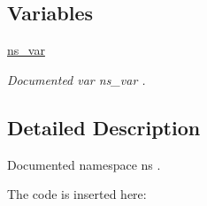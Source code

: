 \subsection*{Variables}
\begin{DoxyCompactItemize}
\item 
\mbox{\hyperlink{namespacens_a23fe65677d9880119abcb457a677453e}{ns\+\_\+var}}
\begin{DoxyCompactList}\small\item\em Documented var {\ttfamily ns\+\_\+var} . \end{DoxyCompactList}\end{DoxyCompactItemize}


\subsection{Detailed Description}
Documented namespace {\ttfamily ns} . 

The code is inserted here\+:


